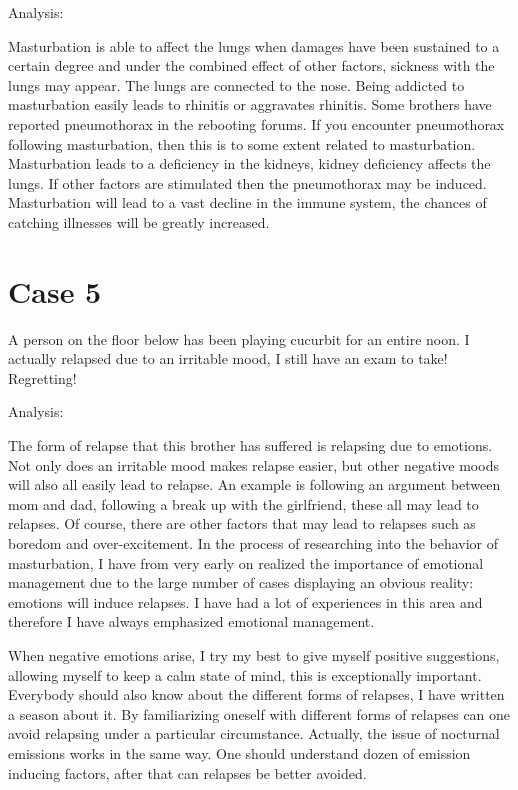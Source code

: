 \documentclass[
]{book}
\begin{document}
Analysis:

Masturbation is able to affect the lungs when damages have been sustained to a certain degree and under the combined effect of other factors, sickness with the lungs may appear. The lungs are connected to the nose. Being addicted to masturbation easily leads to rhinitis or aggravates rhinitis. Some brothers have reported pneumothorax in the rebooting forums. If you encounter pneumothorax following masturbation, then this is to some extent related to masturbation. Masturbation leads to a deficiency in the kidneys, kidney deficiency affects the lungs. If other factors are stimulated then the pneumothorax may be induced. Masturbation will lead to a vast decline in the immune system, the chances of catching illnesses will be greatly increased.

\hypertarget{case-5}{%
\section{Case 5}\label{case-5}}

A person on the floor below has been playing cucurbit for an entire noon. I actually relapsed due to an irritable mood, I still have an exam to take! Regretting!

Analysis:

The form of relapse that this brother has suffered is relapsing due to emotions. Not only does an irritable mood makes relapse easier, but other negative moods will also all easily lead to relapse. An example is following an argument between mom and dad, following a break up with the girlfriend, these all may lead to relapses. Of course, there are other factors that may lead to relapses such as boredom and over-excitement. In the process of researching into the behavior of masturbation, I have from very early on realized the importance of emotional management due to the large number of cases displaying an obvious reality: emotions will induce relapses. I have had a lot of experiences in this area and therefore I have always emphasized emotional management.

When negative emotions arise, I try my best to give myself positive suggestions, allowing myself to keep a calm state of mind, this is exceptionally important. Everybody should also know about the different forms of relapses, I have written a season about it. By familiarizing oneself with different forms of relapses can one avoid relapsing under a particular circumstance. Actually, the issue of nocturnal emissions works in the same way. One should understand dozen of emission inducing factors, after that can relapses be better avoided.
\end{document}
